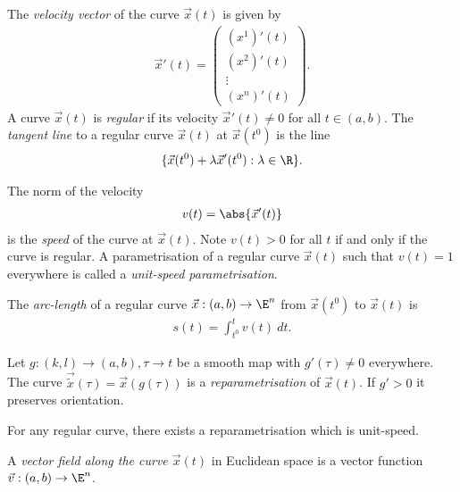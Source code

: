 \documentclass{article}
\begin{document}
\begin{definition}
	The \emph{velocity vector} of the curve $\vec x(t)$ is given by
	\begin{align*}
		\vec x'(t) = \begin{pmatrix}
			(x^1)'(t) \\
			(x^2)'(t) \\
			\vdots    \\
			(x^n)'(t)
		\end{pmatrix}.
	\end{align*}
	A curve $\vec x(t)$ is \emph{regular} if its velocity $\vec x'(t)\not=0$
	for all $t\in(a,b)$. The \emph{tangent line} to a regular curve $\vec x(t)$
	at $\vec x(t^0)$ is the line
	\begin{align*}
		\{\vec x(t^0)+\lambda\vec x'(t^0) : \lambda \in\R\}.
	\end{align*}
\end{definition}

\begin{definition}
	The norm of the velocity
	\begin{align*}
		v(t)=\abs{\vec x'(t)}
	\end{align*}
	is the \emph{speed} of the curve at $\vec x(t)$. Note $v(t)>0$ for all $t$
	if and only if the curve is regular. A parametrisation of a regular curve $\vec x(t)$
	such that $v(t)=1$ everywhere is called a \emph{unit-speed parametrisation}.
\end{definition}

\begin{definition}
	The \emph{arc-length} of a regular curve $\vec x:(a,b)\to \E^n$ from $\vec x(t^0)$
	to $\vec x(t)$ is
	\begin{align*}
		s(t) = \int_{t^0}^t v(t)\:dt.
	\end{align*}
\end{definition}

\begin{definition}
	Let $g:(k,l)\to(a,b), \tau\to t$ be a smooth map with $g'(\tau)\not=0$ everywhere.
	The curve $\vec{\tilde x}(\tau)=\vec x(g(\tau))$ is a \emph{reparametrisation}
	of $\vec x(t)$. If $g'>0$ it preserves orientation.
\end{definition}

\begin{theorem}[Notes 3.6]
	For any regular curve, there exists a reparametrisation which is unit-speed.
\end{theorem}

\begin{definition}
	A \emph{vector field along the curve $\vec x(t)$} in Euclidean space is a vector
	function $\vec v:(a,b)\to\E^n$.
\end{definition}
\end{document}
